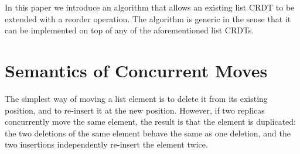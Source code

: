 \documentclass[sigplan,10pt]{acmart}
\begin{document}
In this paper we introduce an algorithm that allows an existing list CRDT to be extended with a reorder operation.
The algorithm is generic in the sense that it can be implemented on top of any of the aforementioned list CRDTs.

\section{Semantics of Concurrent Moves}\label{sec:semantics}

The simplest way of moving a list element is to delete it from its existing position, and to re-insert it at the new position.
However, if two replicas concurrently move the same element, the result is that the element is duplicated: the two deletions of the same element behave the same as one deletion, and the two insertions independently re-insert the element twice.

\end{document}
